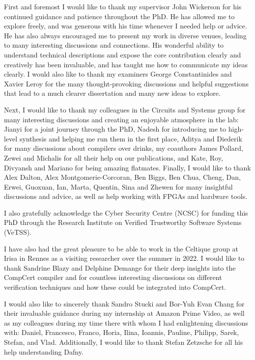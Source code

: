 
First and foremost I would like to thank my supervisor John Wickerson for his
continued guidance and patience throughout the PhD.  He has allowed me to
explore freely, and was generous with his time whenever I needed help or advice.
He has also always encouraged me to present my work in diverse venues, leading
to many interesting discussions and connections.  His wonderful ability to
understand technical descriptions and expose the core contribution clearly and
creatively has been invaluable, and has taught me how to communicate my ideas
clearly.  I would also like to thank my examiners George Constantinides and Xavier Leroy for the many thought-provoking discussions and helpful suggestions that lead to a much clearer dissertation and many new ideas to explore.

Next, I would like to thank my colleagues in the Circuits and Systems group for
many interesting discussions and creating an enjoyable atmosphere in the lab:
Jianyi for a joint journey through the PhD, Nadesh for introducing me to
high-level synthesis and helping me run them in the first place, Aditya and
Diederik for many discussions about compilers over drinks, my coauthors James
Pollard, Zewei and Michalis for all their help on our publications, and Kate,
Roy, Divyansh and Mariano for being amazing flatmates.  Finally, I would like to
thank Alex Dalton, Alex Montgomerie-Corcoran, Ben Biggs, Ben Chua, Cheng, Dan, Erwei, Guoxuan, Ian, Marta, Quentin, Sina and Zhewen
for many insightful discussions and advice, as well as help working with FPGAs
and hardware tools.

I also gratefully acknowledge the Cyber Security Centre (NCSC) for funding this
PhD through the Research Institute on Verified Trustworthy Software Systems
(VeTSS).

I have also had the great pleasure to be able to work in the Celtique group at
Irisa in Rennes as a visiting researcher over the summer in 2022.  I would like
to thank Sandrine Blazy and Delphine Demange for their deep insights into the
CompCert compiler and for countless interesting discussions on different
verification techniques and how these could be integrated into CompCert.

I would also like to sincerely thank Sandro Stucki and Bor-Yuh Evan Chang for
their invaluable guidance during my internship at Amazon Prime Video, as well as
my colleagues during my time there with whom I had enlightening discussions
with: Daniel, Francesco, Franco, Horia, Ilina, Ioannis, Pauline, Philipp, Sarek,
Stefan, and Vlad.  Additionally, I would like to thank Stefan Zetzsche for all
his help understanding Dafny.

